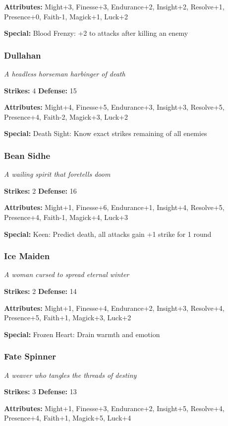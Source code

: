 \documentclass[10pt,twoside]{article}
\begin{document}
\textbf{Attributes:} Might+3, Finesse+3, Endurance+2, Insight+2, Resolve+1, Presence+0, Faith-1, Magick+1, Luck+2

\textbf{Special:} Blood Frenzy: +2 to attacks after killing an enemy

\subsubsection{Dullahan}
\textit{A headless horseman harbinger of death}

\textbf{Strikes:} 4 \quad \textbf{Defense:} 15

\textbf{Attributes:} Might+4, Finesse+5, Endurance+3, Insight+3, Resolve+5, Presence+4, Faith-2, Magick+3, Luck+2

\textbf{Special:} Death Sight: Know exact strikes remaining of all enemies

\subsubsection{Bean Sidhe}
\textit{A wailing spirit that foretells doom}

\textbf{Strikes:} 2 \quad \textbf{Defense:} 16

\textbf{Attributes:} Might+1, Finesse+6, Endurance+1, Insight+4, Resolve+5, Presence+4, Faith-1, Magick+4, Luck+3

\textbf{Special:} Keen: Predict death, all attacks gain +1 strike for 1 round

\subsubsection{Ice Maiden}
\textit{A woman cursed to spread eternal winter}

\textbf{Strikes:} 2 \quad \textbf{Defense:} 14

\textbf{Attributes:} Might+1, Finesse+4, Endurance+2, Insight+3, Resolve+4, Presence+5, Faith+1, Magick+3, Luck+2

\textbf{Special:} Frozen Heart: Drain warmth and emotion

\subsubsection{Fate Spinner}
\textit{A weaver who tangles the threads of destiny}

\textbf{Strikes:} 3 \quad \textbf{Defense:} 13

\textbf{Attributes:} Might+1, Finesse+3, Endurance+2, Insight+5, Resolve+4, Presence+4, Faith+1, Magick+5, Luck+4
\end{document}
